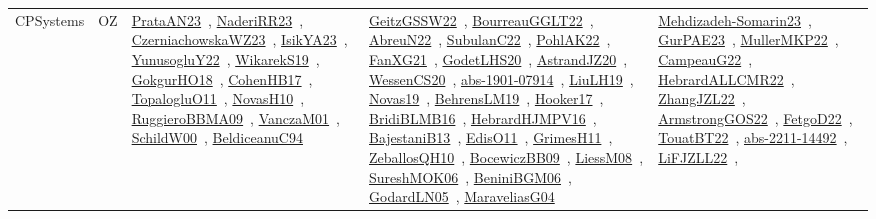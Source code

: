 {\begin{longtable}{lp{3cm}>{\raggedright\arraybackslash}p{6cm}>{\raggedright\arraybackslash}p{6cm}>{\raggedright\arraybackslash}p{8cm}}
CPSystems & OZ & \href{works/PrataAN23.pdf}{PrataAN23}~\cite{PrataAN23}, \href{works/NaderiRR23.pdf}{NaderiRR23}~\cite{NaderiRR23}, \href{works/CzerniachowskaWZ23.pdf}{CzerniachowskaWZ23}~\cite{CzerniachowskaWZ23}, \href{works/IsikYA23.pdf}{IsikYA23}~\cite{IsikYA23}, \href{works/YunusogluY22.pdf}{YunusogluY22}~\cite{YunusogluY22}, \href{works/WikarekS19.pdf}{WikarekS19}~\cite{WikarekS19}, \href{works/GokgurHO18.pdf}{GokgurHO18}~\cite{GokgurHO18}, \href{works/CohenHB17.pdf}{CohenHB17}~\cite{CohenHB17}, \href{works/TopalogluO11.pdf}{TopalogluO11}~\cite{TopalogluO11}, \href{works/NovasH10.pdf}{NovasH10}~\cite{NovasH10}, \href{works/RuggieroBBMA09.pdf}{RuggieroBBMA09}~\cite{RuggieroBBMA09}, \href{works/VanczaM01.pdf}{VanczaM01}~\cite{VanczaM01}, \href{works/SchildW00.pdf}{SchildW00}~\cite{SchildW00}, \href{works/BeldiceanuC94.pdf}{BeldiceanuC94}~\cite{BeldiceanuC94} & \href{works/GeitzGSSW22.pdf}{GeitzGSSW22}~\cite{GeitzGSSW22}, \href{works/BourreauGGLT22.pdf}{BourreauGGLT22}~\cite{BourreauGGLT22}, \href{works/AbreuN22.pdf}{AbreuN22}~\cite{AbreuN22}, \href{works/SubulanC22.pdf}{SubulanC22}~\cite{SubulanC22}, \href{works/PohlAK22.pdf}{PohlAK22}~\cite{PohlAK22}, \href{works/FanXG21.pdf}{FanXG21}~\cite{FanXG21}, \href{works/GodetLHS20.pdf}{GodetLHS20}~\cite{GodetLHS20}, \href{works/AstrandJZ20.pdf}{AstrandJZ20}~\cite{AstrandJZ20}, \href{works/WessenCS20.pdf}{WessenCS20}~\cite{WessenCS20}, \href{works/abs-1901-07914.pdf}{abs-1901-07914}~\cite{abs-1901-07914}, \href{works/LiuLH19.pdf}{LiuLH19}~\cite{LiuLH19}, \href{works/Novas19.pdf}{Novas19}~\cite{Novas19}, \href{works/BehrensLM19.pdf}{BehrensLM19}~\cite{BehrensLM19}, \href{works/Hooker17.pdf}{Hooker17}~\cite{Hooker17}, \href{works/BridiBLMB16.pdf}{BridiBLMB16}~\cite{BridiBLMB16}, \href{works/HebrardHJMPV16.pdf}{HebrardHJMPV16}~\cite{HebrardHJMPV16}, \href{works/BajestaniB13.pdf}{BajestaniB13}~\cite{BajestaniB13}, \href{works/EdisO11.pdf}{EdisO11}~\cite{EdisO11}, \href{works/GrimesH11.pdf}{GrimesH11}~\cite{GrimesH11}, \href{works/ZeballosQH10.pdf}{ZeballosQH10}~\cite{ZeballosQH10}, \href{works/BocewiczBB09.pdf}{BocewiczBB09}~\cite{BocewiczBB09}, \href{works/LiessM08.pdf}{LiessM08}~\cite{LiessM08}, \href{works/SureshMOK06.pdf}{SureshMOK06}~\cite{SureshMOK06}, \href{works/BeniniBGM06.pdf}{BeniniBGM06}~\cite{BeniniBGM06}, \href{works/GodardLN05.pdf}{GodardLN05}~\cite{GodardLN05}, \href{works/MaraveliasG04.pdf}{MaraveliasG04}~\cite{MaraveliasG04} & \href{works/Mehdizadeh-Somarin23.pdf}{Mehdizadeh-Somarin23}~\cite{Mehdizadeh-Somarin23}, \href{works/GurPAE23.pdf}{GurPAE23}~\cite{GurPAE23}, \href{works/MullerMKP22.pdf}{MullerMKP22}~\cite{MullerMKP22}, \href{works/CampeauG22.pdf}{CampeauG22}~\cite{CampeauG22}, \href{works/HebrardALLCMR22.pdf}{HebrardALLCMR22}~\cite{HebrardALLCMR22}, \href{works/ZhangJZL22.pdf}{ZhangJZL22}~\cite{ZhangJZL22}, \href{works/ArmstrongGOS22.pdf}{ArmstrongGOS22}~\cite{ArmstrongGOS22}, \href{works/FetgoD22.pdf}{FetgoD22}~\cite{FetgoD22}, \href{works/TouatBT22.pdf}{TouatBT22}~\cite{TouatBT22}, \href{works/abs-2211-14492.pdf}{abs-2211-14492}~\cite{abs-2211-14492}, \href{works/LiFJZLL22.pdf}{LiFJZLL22}~\cite{LiFJZLL22}, 
\end{longtable}}
